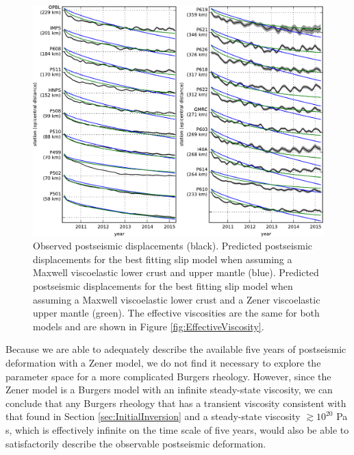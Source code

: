 \documentclass[draft,linenumbers]{AGUJournal}
\begin{document}
\begin{figure}
\includegraphics[scale=0.8]{Figures/RecordSectionFinal}
\centering 
\caption{Observed postseismic displacements (black). Predicted postseismic displacements for the best fitting slip model when assuming a Maxwell viscoelastic lower crust and upper mantle (blue).  Predicted postseismic displacements for the best fitting slip model when assuming a Maxwell viscoelastic lower crust and a Zener viscoelastic upper mantle (green).  The effective viscosities are the same for both models and are shown in Figure \ref{fig:EffectiveViscosity}.}
\label{fig:RecordSection2}
\end{figure} 

Because we are able to adequately describe the available five years of postseismic deformation with a Zener model, we do not find it necessary to explore the parameter space for a more complicated Burgers rheology.  However, since the Zener model is a Burgers model with an infinite steady-state viscosity, we can conclude that any Burgers rheology that has a transient viscosity consistent with that found in Section \ref{sec:InitialInversion} and a steady-state viscosity $\gtrsim10^{20}$ Pa s, which is effectively infinite on the time scale of five years, would also be able to satisfactorily describe the observable postseismic deformation.        
  
\end{document}
